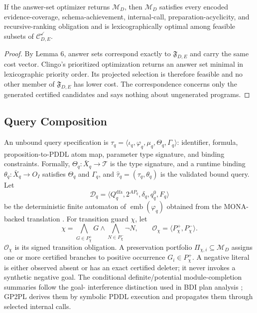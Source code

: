 \begin{proposition}
If the answer-set optimizer returns $\mathcal M_D$, then $\mathcal M_D$ satisfies every
encoded evidence-coverage, schema-achievement, internal-call,
preparation-acyclicity, and recursive-ranking obligation and is
lexicographically optimal among feasible subsets of
$\mathcal C^{\checkmark}_{D,E}$.
\end{proposition}

\begin{proof}
By Lemma 6, answer sets correspond exactly to
$\mathfrak F_{D,E}$ and carry the same cost vector. Clingo's prioritized
optimization returns an answer set minimal in lexicographic priority order.
Its projected selection is therefore feasible and no other member of
$\mathfrak F_{D,E}$ has lower cost. The correspondence concerns only the
generated certified candidates and says nothing about ungenerated programs.
\end{proof}

\subsection{Query Composition}

An unbound query specification is
$\tau_q=\langle\iota_q,\varphi_q,\mu_q,\Theta_q,\Gamma_q\rangle$: identifier,
\ltlf{} formula, proposition-to-PDDL atom map, parameter type signature, and
binding constraints. Formally,
$\Theta_q:\bar X_q\rightarrow\mathcal T$ is the type signature, and a runtime
binding
$\theta_q:\bar X_q\rightarrow O_I$ satisfies $\Theta_q$ and $\Gamma_q$, and
$\widehat\tau_q=(\tau_q,\theta_q)$ is the validated bound query. Let
\[
\mathcal D_q=
\langle Q_q^{\mathrm{dfa}},2^{AP_q},\delta_q,q_q^0,F_q\rangle
\]
be the deterministic finite automaton of $\operatorname{emb}(\varphi_q)$ obtained
from the MONA-backed translation
\cite{DeGiacomoVardi2013,Fuggitti2020LTLf2DFA}. For transition guard $\chi$, let
\[
\chi=\bigwedge_{G\in P_\chi^+}G\land
\bigwedge_{N\in P_\chi^-}\neg N,
\qquad
\mathcal O_\chi=\langle P_\chi^+,P_\chi^-\rangle.
\]
$\mathcal O_\chi$ is its signed transition obligation. A preservation portfolio
$\Pi_{\chi,i}\subseteq\mathcal M_D$ assigns one or more certified branches to
positive occurrence $G_i\in P_\chi^+$. A negative literal is either observed
absent or has an exact certified deleter; it never invokes a synthetic negative
goal. The conditional definite/potential module-completion summaries follow the goal-
interference distinction used in BDI plan analysis
\cite{Thangarajah2003GoalInterference}; GP2PL derives them by symbolic PDDL
execution and propagates them through selected internal calls.


